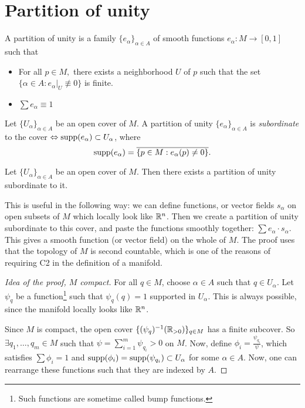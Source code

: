 
\section{Partition of unity}

\begin{definition}
    A partition of unity is a family $\{e_\alpha\}_{\alpha \in A}$ of smooth functions $e_\alpha: M \to  [0, 1]$ such that
    \begin{itemize}
        \item For all $p \in M,$ there exists a neighborhood $U$ of $p$ such that the set $\{\alpha \in A: e_\alpha|_U \not\equiv 0\} $ is finite.
        \item $\sum e_\alpha \equiv 1$
    \end{itemize}
\end{definition}
\begin{definition}[Subordinate]
    Let $\{U_\alpha\}_{\alpha \in A}$ be an open cover of $M$.
    A partition of unity $\{e_\alpha\}_{\alpha \in A}$ is \emph{subordinate} to the cover $\Leftrightarrow \operatorname{supp}(e_\alpha) \subset U_\alpha$, where
    \[
        \operatorname{supp}( e_\alpha) = \overline{\{p \in M: e_\alpha(p) \neq 0\}}
    .\] 

\end{definition}
\begin{prop}
    Let $\{U_\alpha\}_{\alpha \in A}$ be an open cover of $M$.
    Then  there exists a partition of unity subordinate to it.
\end{prop}

This is useful in the following way: we can define functions, or vector fields $s_{\alpha}$ on open subsets   of $M$ which locally look like $\mathbb{R}^n$. Then we create a partition of unity subordinate to this cover, and paste the functions smoothly together: $\sum e_\alpha \cdot s_\alpha$.
This gives a smooth function (or vector field) on the whole of $M$.
The proof uses that the topology of $M$ is second countable, which is one of the reasons of requiring C2 in the definition of a manifold.

\begin{proof}[Idea of the proof, $M$ compact]
    For all $q \in M$, choose $\alpha \in A$ such that $q \in U_\alpha$.
    Let $\psi_q$ be a  function\footnote{Such functions are sometime called bump functions.} such that $\psi_q(q) = 1$ supported in $U_\alpha$. This is always possible, since the manifold locally looks like $\mathbb{R}^n$.

    Since $M$ is compact, the open cover $\{ (\psi_q)^{-1} (\mathbb{R}_{>0})\}_{q \in M}$ has a finite subcover.
    So $\exists q_1, \ldots, q_m \in M$ such that $\psi = \sum_{i=1}^{m} \psi_{q_i} > 0$ on $M$.
    Now, define $\phi_i = \frac{\psi_{q_i}}{\psi}$, which satisfies $\sum \phi_i = 1$ and $\operatorname{supp}(\phi_i) = \operatorname{supp}(\psi_{q_i}) \subset U_\alpha$ for some $\alpha \in A$.
    Now, one can rearrange these functions such that they are indexed by $A$.
\end{proof}

